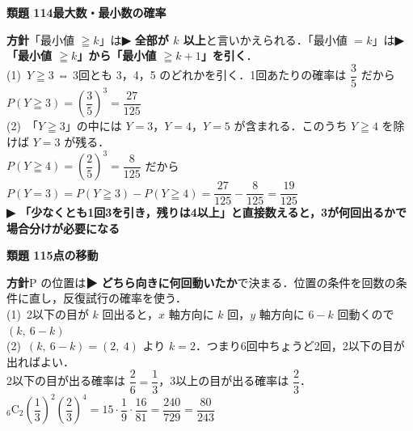 \documentclass[a4paper,11pt]{ltjsarticle}
\newcommand{\ans}[2]{\Needspace{5\baselineskip}\vspace{6pt}%
  {\sffamily\bfseries 類題 #1\quad #2}\par}
\newcommand{\point}[1]{\textsf{\bfseries ▶ #1}}
\begin{document}
\ans{114}{最大数・最小数の確率}
\begin{kai}
\textbf{方針}\quad 「最小値 $\geqq k$」は\point{全部が $k$ 以上}と言いかえられる．「最小値 $=k$」は\point{「最小値 $\geqq k$」から「最小値 $\geqq k+1$」を引く}．\\[2pt]
(1)\ $Y\geqq3$ ⇔ 3回とも 3，4，5 のどれかを引く．1回あたりの確率は $\dfrac35$ だから\\
\hspace*{1.5em}$P(Y\geqq3)=\left(\dfrac35\right)^3=\dfrac{27}{125}$\\[2pt]
(2)\ 「$Y\geqq3$」の中には $Y=3$，$Y=4$，$Y=5$ が含まれる．このうち $Y\geqq4$ を除けば $Y=3$ が残る．\\
\hspace*{1.5em}$P(Y\geqq4)=\left(\dfrac25\right)^3=\dfrac{8}{125}$ だから\\
\hspace*{1.5em}$P(Y=3)=P(Y\geqq3)-P(Y\geqq4)=\dfrac{27}{125}-\dfrac{8}{125}=\dfrac{19}{125}$\\
\hspace*{1.5em}\point{「少なくとも1回3を引き，残りは4以上」と直接数えると，3が何回出るかで場合分けが必要になる}
\end{kai}

\ans{115}{点の移動}
\begin{kai}
\textbf{方針}\quad P の位置は\point{どちら向きに何回動いたか}で決まる．位置の条件を回数の条件に直し，反復試行の確率を使う．\\[2pt]
(1)\ 2以下の目が $k$ 回出ると，$x$ 軸方向に $k$ 回，$y$ 軸方向に $6-k$ 回動くので\quad $(k,\ 6-k)$\\[2pt]
(2)\ $(k,\ 6-k)=(2,\ 4)$ より $k=2$．つまり6回中ちょうど2回，2以下の目が出ればよい．\\
\hspace*{1.5em}2以下の目が出る確率は $\dfrac26=\dfrac13$，3以上の目が出る確率は $\dfrac23$．\\
\hspace*{1.5em}${}_6\mathrm C_2\left(\dfrac13\right)^2\left(\dfrac23\right)^4=15\cdot\dfrac19\cdot\dfrac{16}{81}=\dfrac{240}{729}=\dfrac{80}{243}$
\end{kai}
\end{document}
